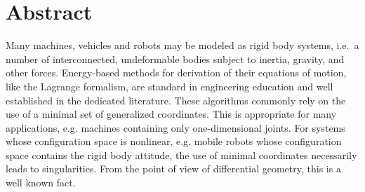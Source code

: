 \thispagestyle{plain}

% 
% 
% 
% 
% 

\section*{Abstract}
Many machines, vehicles and robots may be modeled as rigid body systems, i.e.\ a number of interconnected, undeformable bodies subject to inertia, gravity, and other forces.
Energy-based methods for derivation of their equations of motion, like the Lagrange formalism, are standard in engineering education and well established in the dedicated literature.
These algorithms commonly rely on the use of a minimal set of generalized coordinates.
This is appropriate for many applications, e.g. machines containing only one-dimensional joints.
For systems whose configuration space is nonlinear, e.g. mobile robots whose configuration space contains the rigid body attitude, the use of minimal coordinates necessarily leads to singularities.
From the point of view of differential geometry, this is a well known fact.

